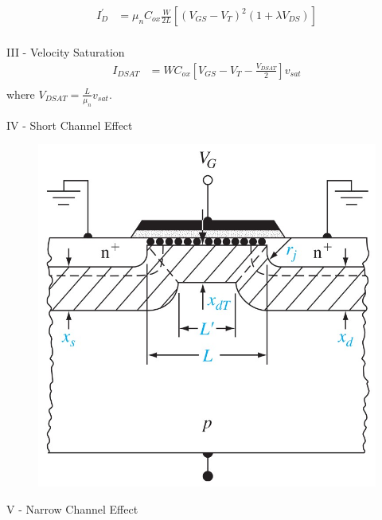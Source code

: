 \documentclass[a4paper, twocolumn]{article}
\begin{document}
    \begin{equation*}
        \begin{aligned}
             I^\prime_D &= \mu_n C_{ox} \frac{W}{2L} \left[\left( V_{GS} - V_T \right)^2  (1 + \lambda V_{DS}) \right] \\
        \end{aligned}
    \end{equation*}
    \par III - Velocity Saturation \\
    \begin{equation*}
        \begin{aligned}
            I_{DSAT} &= WC_{ox} \left[ V_{GS} - V_{T} - \frac{V_{DSAT} }{2}  \right] v_{sat} \\
        \end{aligned}
    \end{equation*}
    where $V_{DSAT} = \frac{L}{\mu_n} v_{sat}$.
    \par IV - Short Channel Effect \\
    \begin{figure}[H]
        \centering
        \includegraphics[width=0.5\linewidth]{Short-channel-effects.jpg}
        \label{fig:Short-channel-effects.jpg}
    \end{figure}   
    \par V - Narrow Channel Effect \\
    
\end{document}

